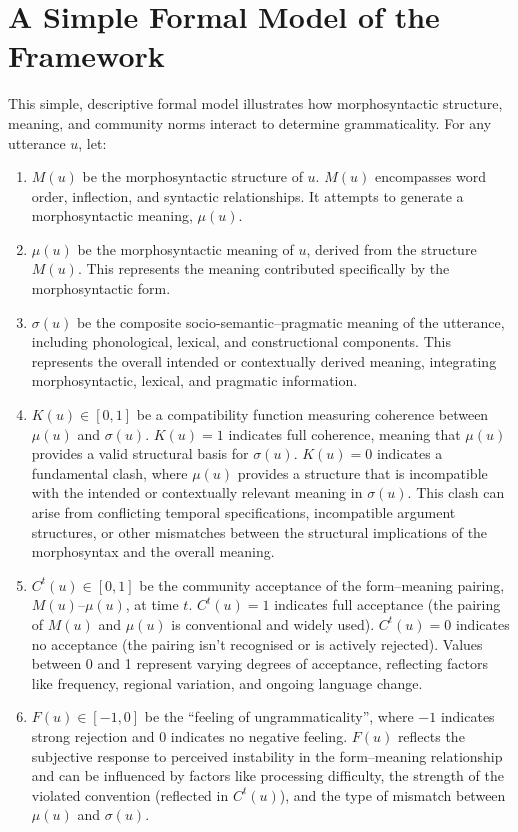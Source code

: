 \section{A Simple Formal Model of the Framework}\label{sec:formalism}

This simple, descriptive formal model illustrates how morphosyntactic structure, meaning, and community norms interact to determine grammaticality. For any utterance $u$, let:

\begin{enumerate}
    \item $M(u)$ be the morphosyntactic structure of $u$. $M(u)$ encompasses word order, inflection, and syntactic relationships. It attempts to generate a morphosyntactic meaning, $\mu(u)$.
    \item $\mu(u)$ be the morphosyntactic meaning of $u$, derived from the structure $M(u)$. This represents the meaning contributed specifically by the morphosyntactic form.
    \item $\sigma(u)$ be the composite socio-semantic--pragmatic meaning of the utterance, including phonological, lexical, and constructional components. This represents the overall intended or contextually derived meaning, integrating morphosyntactic, lexical, and pragmatic information.
    \item $K(u) \in [0,1]$ be a compatibility function measuring coherence between $\mu(u)$ and $\sigma(u)$. $K(u) = 1$ indicates full coherence, meaning that $\mu(u)$ provides a valid structural basis for $\sigma(u)$. $K(u) = 0$ indicates a fundamental clash, where $\mu(u)$ provides a structure that is incompatible with the intended or contextually relevant meaning in $\sigma(u)$. This clash can arise from conflicting temporal specifications, incompatible argument structures, or other mismatches between the structural implications of the morphosyntax and the overall meaning.
    \item $C^t(u) \in [0,1]$ be the community acceptance of the form--meaning pairing, $M(u)$--$\mu(u)$, at time $t$. $C^t(u) = 1$ indicates full acceptance (the pairing of $M(u)$ and $\mu(u)$ is conventional and widely used). $C^t(u) = 0$ indicates no acceptance (the pairing isn't recognised or is actively rejected). Values between 0 and 1 represent varying degrees of acceptance, reflecting factors like frequency, regional variation, and ongoing language change.
    \item $F(u) \in [-1,0]$ be the \enquote{feeling of ungrammaticality}, where $-1$ indicates strong rejection and $0$ indicates no negative feeling. $F(u)$ reflects the subjective response to perceived instability in the form--meaning relationship and can be influenced by factors like processing difficulty, the strength of the violated convention (reflected in $C^t(u)$), and the type of mismatch between $\mu(u)$ and $\sigma(u)$.
\end{enumerate}

